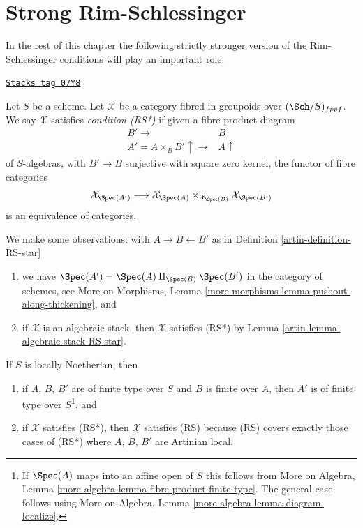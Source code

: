 \section{Strong Rim-Schlessinger}
\label{artin-section-RS-star}
In the rest of this chapter the following strictly stronger version
of the Rim-Schlessinger conditions will play an important role.

\begin{definition}[RS star]
\label{artin-definition-RS-star}
\href{https://stacks.math.columbia.edu/tag/07Y8}{\texttt{Stacks tag 07Y8}}

Let $S$ be a scheme. Let $\mathcal{X}$ be a category
fibred in groupoids over $(\Sch/S)_{fppf}$. We say $\mathcal{X}$
satisfies {\it condition (RS*)} if given a fibre product diagram
$$
\begin{array}{cc}B' \longrightarrow & B \\ A' = A \times_B B' \uparrow\longrightarrow & A \uparrow\end{array}
$$
of $S$-algebras, with $B' \to B$ surjective with square zero kernel,
the functor of fibre categories
$$
\mathcal{X}_{\Spec(A')}
\longrightarrow
\mathcal{X}_{\Spec(A)} \times_{\mathcal{X}_{\Spec(B)}} \mathcal{X}_{\Spec(B')}
$$
is an equivalence of categories.
\end{definition}

We make some observations:
with $A \to B \leftarrow B'$ as in Definition \ref{artin-definition-RS-star}
\begin{enumerate}
\item we have $\Spec(A') = \Spec(A) \amalg_{\Spec(B)} \Spec(B')$
in the category of schemes, see
More on Morphisms, Lemma \ref{more-morphisms-lemma-pushout-along-thickening},
and
\item if $\mathcal{X}$ is an algebraic stack, then $\mathcal{X}$ satisfies
(RS*) by Lemma \ref{artin-lemma-algebraic-stack-RS-star}.
\end{enumerate}
If $S$ is locally Noetherian, then
\begin{enumerate}
\item[(3)] if $A$, $B$, $B'$ are of finite type over $S$ and
$B$ is finite over $A$, then $A'$ is of finite type over
$S$\footnote{If $\Spec(A)$ maps into an affine open of $S$
this follows from
More on Algebra, Lemma \ref{more-algebra-lemma-fibre-product-finite-type}.
The general case follows using
More on Algebra, Lemma \ref{more-algebra-lemma-diagram-localize}.}, and
\item[(4)] if $\mathcal{X}$ satisfies (RS*), then $\mathcal{X}$ satisfies (RS)
because (RS) covers exactly those cases of (RS*) where
$A$, $B$, $B'$ are Artinian local.
\end{enumerate}

